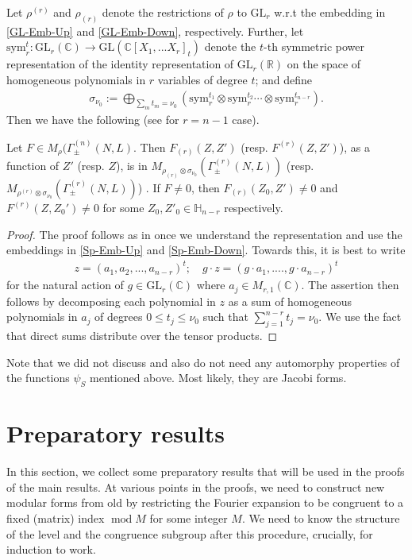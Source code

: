 \documentclass[11pt]{amsart}
\numberwithin{equation}{section}
\newcommand{\mbb}{\mathbb}
\newcommand{\mrm}{\mathrm} %
\renewcommand*{\mod}{\operatorname{mod}}
\newcommand{\q}{\quad}
\newcommand{\Mrho}[2]{M_\rho(\Gamma_\pm^{(#1)}(#2, L)}
\begin{document}
Let $\rho^{(r)}$ and $\rho_{(r)}$ denote the restrictions of $\rho$ to $\mrm{GL}_{r}$ w.r.t the embedding in \eqref{GL-Emb-Up} and \eqref{GL-Emb-Down}, respectively. Further, let $\mrm{sym}^{t}_r:\mrm{GL}_r(\mbb C)\longrightarrow \mrm{GL}(\mbb C[X_1,...X_r]_t)$ denote the $t$-th symmetric power representation of the identity representation of $\mrm{GL}_r(\mbb R)$ on the space of homogeneous polynomials in $r$ variables of degree $t$; and define
\begin{align}
    \sigma_{\nu_0}:=\bigoplus_{\sum_m t_m=\nu_0} \left(   \mrm{sym}^{t_1}_r \otimes \mrm{sym}^{t_2}_r \cdots \otimes \mrm{sym}^{t_{n-r}}_r \right).
\end{align}
Then we have the following (see \cite[Proposition 3.1]{boche-das} for $r=n-1$ case).
\begin{proposition}\label{prop:Fcirc}
    Let $F\in \Mrho{n}{N}$. Then $F_{(r)}(Z, Z')$ (resp. $F^{(r)}(Z,Z')$), as a function of $Z'$ (resp. $Z$), is in $M_{\rho_{(r)}\otimes \sigma_{\nu_0}}(\Gamma_\pm^{(r)}(N,L))$ (resp. $M_{\rho^{(r)}\otimes \sigma_{\nu_0}}(\Gamma_\pm^{(r)}(N,L))$) . If $F\neq 0$, then $F_{(r)}(Z_0, Z')\neq 0$ and $F^{(r)}(Z, Z_0')\neq 0$ for some $Z_0, Z'_0\in \mbb H_{n-r}$ respectively.
\end{proposition}
\begin{proof}
The proof follows as in \cite[Proposition 3.1]{boche-das} once we understand the representation and use the embeddings in \eqref{Sp-Emb-Up} and \eqref{Sp-Emb-Down}. Towards this, it is best to write 
    \begin{align}
        z= (a_1, a_2,...,a_{n-r})^t; \q g\cdot z= (g \cdot a_1,...., g \cdot a_{n-r} )^t
    \end{align}
for the natural action of $g \in \mrm{GL}_r(\mbb C)$ where $a_j \in M_{r,1}(\mbb C)$. The assertion then follows by decomposing each polynomial in $z$ as a sum of homogeneous polynomials in $a_j$ of degrees $0 \le t_j \le \nu_0$ such that $\sum_{j=1}^{n-r} t_j=\nu_0$. We use the fact that direct sums distribute over the tensor products.
\end{proof}
\begin{remark}
    Note that we did not discuss and also do not need any automorphy properties of the functions $\psi_S$ mentioned above. Most likely, they are Jacobi forms.
\end{remark}
\section{Preparatory results}
In this section, we collect some preparatory results that will be used in the proofs of the main results. At various points in the proofs, we need to construct new modular forms from old by restricting the Fourier expansion to be congruent to a fixed (matrix) index $\mod M$ for some integer $M$. We need to know the structure of the level and the congruence subgroup after this procedure, crucially, for induction to work.
\end{document}
